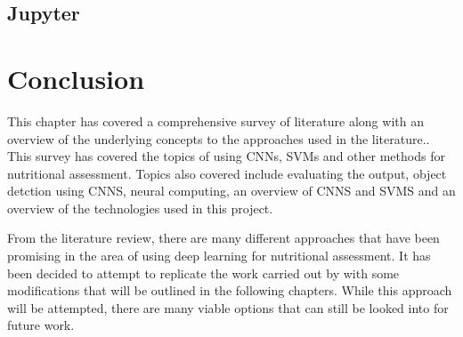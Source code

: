 \subsection*{Jupyter}


\section{Conclusion}
This chapter has covered a comprehensive survey of literature along with an overview of the underlying concepts to the approaches used in the literature..
This survey has covered the topics of using CNNs, SVMs and other methods for nutritional assessment.
Topics also covered include evaluating the output, object detction using CNNS, neural computing, an overview of CNNS and SVMS and an overview of the technologies used in this project.

From the literature review, there are many different approaches that have been promising in the area of using deep learning for nutritional assessment.
It has been decided to attempt to replicate the work carried out by \parencite{yanaiFood} with some modifications that will be outlined in the following chapters.
While this approach will be attempted, there are many viable options that can still be looked into for future work.


